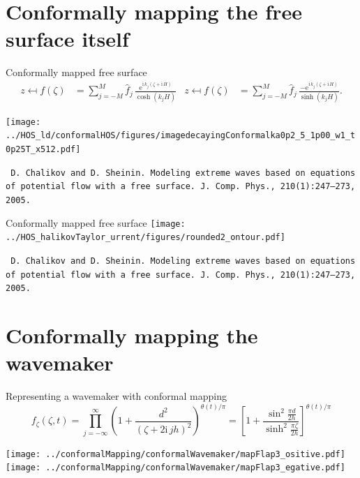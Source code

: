 \documentclass{sintefbeamer}
\newcommand{\mr}{\mathrm}
\newcommand{\ii}{\mr{i}\,}
\newcommand{\ee}{\mr{e}}
\renewcommand{\_}[1]{_\mr{#1}}
\newcommand{\z}{z}
\newcommand{\zz}{\zeta}
\newcommand{\h}{\hat}
\newcommand{\rbr}[1]{\left(#1\right)}
\newcommand{\sbr}[1]{\left[#1\right]}
\begin{document}

\section{Conformally mapping the free surface itself}

\begin{frame}{Conformally mapped free surface}
\centering
\vspace{-1cm}
\small
\begin{align*}
\z \mapsfrom f(\zz) &= \sum_{j=-M}^M \h f_j \,\frac{\ee^{\ii k_j(\zz+\ii H)}}{\cosh(k_j H)}
&
\z \mapsfrom f(\zz) &= \sum_{j=-M}^M \h f_j \,\frac{-\ee^{\ii k_j(\zz+\ii H)}}{\sinh(k_j H)}.
 \end{align*}%
\normalsize

\texttt{[image: ../HOS\_old/conformalHOS/figures/imagedecayingConformalka0p2\_M5\_h1p00\_Nw1\_dt0p25T\_nx512.pdf]}%

\begin{flushleft}
	\texttt{ \scriptsize D. Chalikov and D. Sheinin. Modeling extreme waves based on equations of potential
		flow with a free surface. J.\ Comp. Phys., 210(1):247–273, 2005.}
\end{flushleft}
\end{frame}

\begin{frame}{Conformally mapped free surface}
	\centering
\vspace{-.5cm}
\texttt{[image: ../HOS\_ChalikovTaylor\_current/figures/rounded2\_contour.pdf]}%



\begin{flushleft}
	\texttt{ \scriptsize D. Chalikov and D. Sheinin. Modeling extreme waves based on equations of potential
		flow with a free surface. J.\ Comp. Phys., 210(1):247–273, 2005.}
\end{flushleft}

\end{frame}



\section{Conformally mapping the wavemaker}

\begin{frame}{Representing a wavemaker with conformal mapping}
	\centering
\vspace{-1cm}
	\begin{equation*}
f_\zz(\zz,t) = \prod_{j=-\infty}^\infty \rbr{1+\frac{d^2}{\rbr{\zz+2\ii j h}^2}}^{\theta(t)/\pi}
= \sbr{1+\frac{\sin^2\!\frac{\pi d}{2h}}{\sinh^2\!\frac{\pi \zz}{2h}}}^{\theta(t)/\pi}
\end{equation*}

\texttt{[image: ../conformalMapping/conformalWavemaker/mapFlap3\_positive.pdf]}%
\texttt{[image: ../conformalMapping/conformalWavemaker/mapFlap3\_negative.pdf]}%
\end{frame}
\end{document}
